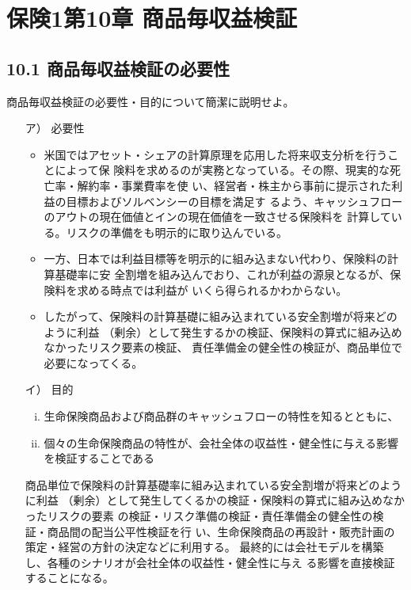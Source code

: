 \documentclass[report,gutter=10mm,fore-edge=10mm,uplatex,dvipdfmx]{jlreq}
\begin{document}
\chapter{保険1第10章 商品毎収益検証}
\section{10.1 商品毎収益検証の必要性}
商品毎収益検証の必要性・目的について簡潔に説明せよ。

\begin{itemize}
 \item [ア）] 必要性
\begin{itemize}
 \item 
米国ではアセット・シェアの計算原理を応用した将来収支分析を行うことによって保
険料を求めるのが実務となっている。その際、現実的な死亡率・解約率・事業費率を使
い、経営者・株主から事前に提示された利益の目標およびソルベンシーの目標を満足す
るよう、キャッシュフローのアウトの現在価値とインの現在価値を一致させる保険料を
計算している。リスクの準備をも明示的に取り込んでいる。
 \item 
一方、日本では利益目標等を明示的に組み込まない代わり、保険料の計算基礎率に安
全割増を組み込んでおり、これが利益の源泉となるが、保険料を求める時点では利益が
いくら得られるかわからない。
 \item 
したがって、保険料の計算基礎に組み込まれている安全割増が将来どのように利益
（剰余）として発生するかの検証、保険料の算式に組み込めなかったリスク要素の検証、
責任準備金の健全性の検証が、商品単位で必要になってくる。
\end{itemize}

 \item [イ）] 目的

\begin{enumerate} [(i)]
 \item 生命保険商品および商品群のキャッシュフローの特性を知るとともに、
 \item 個々の生命保険商品の特性が、会社全体の収益性・健全性に与える影響を検証することである
\end{enumerate}

商品単位で保険料の計算基礎率に組み込まれている安全割増が将来どのように利益
（剰余）として発生してくるかの検証・保険料の算式に組み込めなかったリスクの要素
の検証・リスク準備の検証・責任準備金の健全性の検証・商品間の配当公平性検証を行
い、生命保険商品の再設計・販売計画の策定・経営の方針の決定などに利用する。
最終的には会社モデルを構築し、各種のシナリオが会社全体の収益性・健全性に与え
る影響を直接検証することになる。

\end{itemize}
\end{document}
